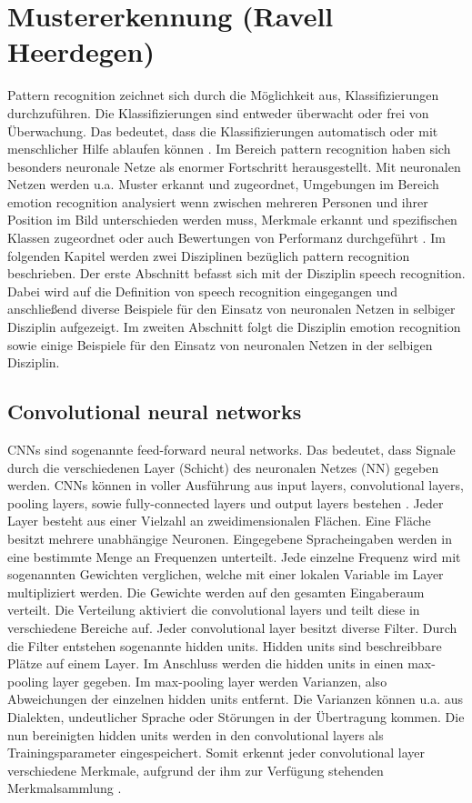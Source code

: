 \section{Mustererkennung (Ravell Heerdegen)} \label{Mustererkennung}
Pattern recognition zeichnet sich durch die Möglichkeit aus, Klassifizierungen durchzuführen. Die Klassifizierungen sind entweder überwacht oder frei von Überwachung. Das bedeutet, dass die Klassifizierungen automatisch oder mit menschlicher Hilfe ablaufen können \cite{svmgmm}. Im Bereich pattern recognition haben sich besonders neuronale Netze als enormer Fortschritt herausgestellt. Mit neuronalen Netzen werden u.a. Muster erkannt und zugeordnet, Umgebungen im Bereich emotion recognition analysiert wenn zwischen mehreren Personen und ihrer Position im Bild unterschieden werden muss, Merkmale erkannt und spezifischen Klassen zugeordnet oder auch Bewertungen von Performanz durchgeführt \cite{patternrec}.
Im folgenden Kapitel werden zwei Disziplinen bezüglich pattern recognition beschrieben. Der erste Abschnitt befasst sich mit der Disziplin speech recognition. Dabei wird auf die Definition von speech recognition eingegangen und anschließend diverse Beispiele für den Einsatz von neuronalen Netzen in selbiger Disziplin aufgezeigt.
Im zweiten Abschnitt folgt die Disziplin emotion recognition sowie einige Beispiele für den Einsatz von neuronalen Netzen in der selbigen Disziplin.

\subsection{Convolutional neural networks}
CNNs sind sogenannte feed-forward neural networks. Das bedeutet, dass Signale durch die verschiedenen Layer (Schicht) des neuronalen Netzes (NN) gegeben werden. CNNs können in voller Ausführung aus input layers, convolutional layers, pooling layers, sowie fully-connected layers und output layers bestehen \cite{facialemotionrecusingcnn}. Jeder Layer besteht aus einer Vielzahl an zweidimensionalen Flächen. Eine Fläche besitzt mehrere unabhängige Neuronen. Eingegebene Spracheingaben werden in eine bestimmte Menge an Frequenzen unterteilt. Jede einzelne Frequenz wird mit sogenannten Gewichten verglichen, welche mit einer lokalen Variable im Layer multipliziert werden. Die Gewichte werden auf den gesamten Eingaberaum verteilt. Die Verteilung aktiviert die convolutional layers und teilt diese in verschiedene Bereiche auf. Jeder convolutional layer besitzt diverse Filter. Durch die Filter entstehen sogenannte hidden units. Hidden units sind beschreibbare Plätze auf einem Layer. Im Anschluss werden die hidden units in einen max-pooling layer gegeben. Im max-pooling layer werden Varianzen, also Abweichungen der einzelnen hidden units entfernt. Die Varianzen können u.a. aus Dialekten, undeutlicher Sprache oder Störungen in der Übertragung kommen. Die nun bereinigten hidden units werden in den convolutional layers als Trainingsparameter eingespeichert. Somit erkennt jeder convolutional layer verschiedene Merkmale, aufgrund der ihm zur Verfügung stehenden Merkmalsammlung \cite{usingcnn}.

\vspace{3.0cm}